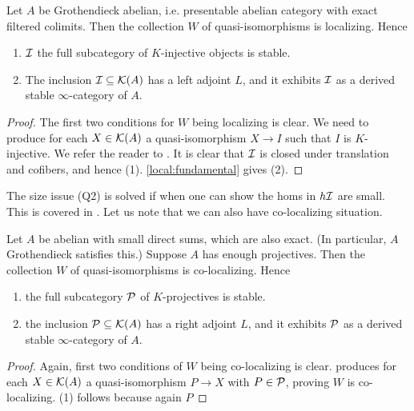 \documentclass{article}
\begin{document}
\begin{prop}
  Let $A$ be Grothendieck abelian,
  i.e. presentable abelian category with exact filtered colimits.
  Then the collection $W$ of quasi-isomorphisms is localizing.
  Hence \begin{enumerate}
    \item $\mathcal{I}$ the full subcategory of
    $K$-injective objects is stable.
    \item The inclusion $\mathcal{I} \subseteq \mathcal{K}(A)$ has a left adjoint
    $L$, and it exhibits $\mathcal{I}$ as a derived stable $\infty$-category of $A$.
  \end{enumerate}
\end{prop}
\begin{proof}
  The first two conditions for $W$ being localizing is clear.
  We need to produce for each $X \in \mathcal{K}(A)$
  a quasi-isomorphism $X \to I$ such that $I$ is $K$-injective.
  We refer the reader to \cite[Theorem 14.3.1]{KS06}.
  It is clear that $\mathcal{I}$ is closed under translation
  and cofibers, and hence (1).
  \ref{local:fundamental} gives (2).
\end{proof}
The size issue (Q2) is solved if when one can show
the homs in $h \mathcal{I}$ are small.
This is covered in \cite[Prop. 1.3.5.14]{lurie-HA}.
Let us note that we can also have co-localizing situation.
\begin{prop}
  Let $A$ be abelian with small direct sums,
  which are also exact. (In particular, $A$ Grothendieck satisfies this.)
  Suppose $A$ has enough projectives.
  Then the collection $W$ of quasi-isomorphisms is co-localizing.
  Hence \begin{enumerate}
    \item the full subcategory $\mathcal{P}$ of $K$-projectives is stable.
    \item the inclusion $\mathcal{P} \subseteq \mathcal{K}(A)$ has a right adjoint $L$,
    and it exhibits $\mathcal{P}$ as a derived stable $\infty$-category of $A$.
  \end{enumerate}
\end{prop}
\begin{proof}
  Again, first two conditions of $W$ being co-localizing is clear.
  \cite[Theorem 14.4.3]{KS06} produces for each $X \in \mathcal{K}(A)$
  a quasi-isomorphism $P \to X$ with $P \in \mathcal{P}$,
  proving $W$ is co-localizing.
  (1) follows because again $P$
\end{proof}
\end{document}
